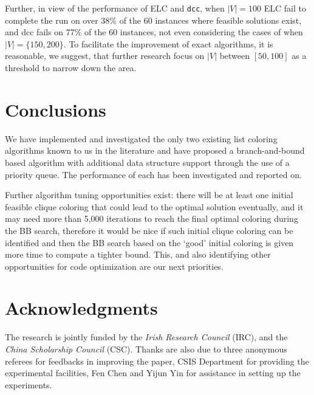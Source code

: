 \documentclass[10pt]{article}
\begin{document}
Further, in view of the performance of ELC and \texttt{dcc},  when $|V| = 100$ ELC fail to complete the run on over 38\% of the 60 instances where feasible solutions exist, and dcc fails on 77\% of the 60 instances, not even considering the cases of when $|V| = \{150, 200\}$.  To facilitate the improvement of exact
algorithms, it is reasonable, we suggest, that further research focus on
$|V|$ between $[50, 100]$ as a threshold to narrow down the area.
 
\section{Conclusions}\label{sec:concls} 

We have implemented and investigated the only two existing list coloring
algorithms known to us in the literature and have proposed a
branch-and-bound based algorithm with additional data structure support
through the use of a priority queue. The performance of each has been
investigated and reported on.

Further algorithm tuning opportunities exist: there will be at least one initial feasible clique coloring
that could lead to the optimal solution eventually, and it may need more than 5,000 iterations
to reach the final optimal coloring during the BB search, therefore it would be nice if such 
initial clique coloring can be identified and then the BB search based on the `good' initial coloring is 
given more time to compute a tighter bound. This, and also identifying other opportunities for 
code optimization are our next priorities.

\section*{Acknowledgments}\label{sec:ack} The research is jointly funded by the \textit{Irish Research Council}
(IRC), and the \textit{China Scholarship Council} (CSC). 
Thanks are also due to three anonymous referees for feedbacks in improving 
the paper, CSIS Department for providing the experimental facilities, Fen Chen and 
Yijun Yin for assistance in setting up the experiments.




\end{document}

